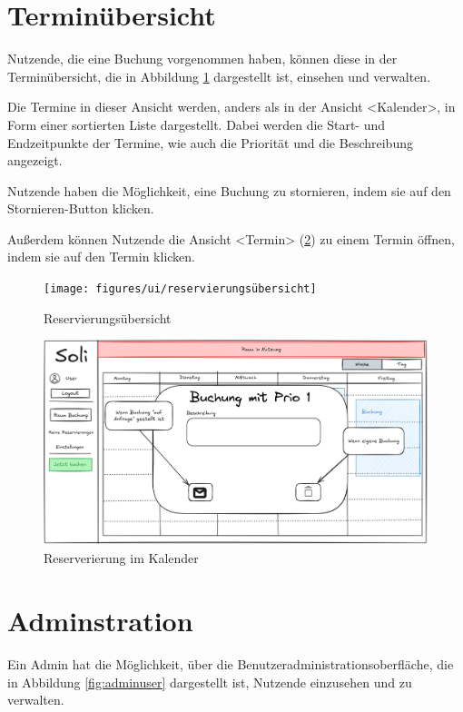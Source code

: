 \section{Terminübersicht}
Nutzende, die eine Buchung vorgenommen haben, können diese in der Terminübersicht,
die in Abbildung \ref{fig:overview} dargestellt ist, einsehen und verwalten.

Die Termine in dieser Ansicht werden, anders als in der Ansicht <Kalender>, in Form einer sortierten Liste dargestellt.
Dabei werden die Start- und Endzeitpunkte der Termine, wie auch die Priorität und die Beschreibung angezeigt.

Nutzende haben die Möglichkeit, eine Buchung zu stornieren, indem sie auf den Stornieren-Button klicken.

Außerdem können Nutzende die Ansicht <Termin> (\ref{fig:calendarviewbooking}) zu einem Termin öffnen, indem sie auf den Termin klicken.

\begin{figure}[ht]
    \texttt{[image: figures/ui/reservierungsübersicht]}
    \caption{Reservierungsübersicht}
    \label{fig:overview}
\end{figure}
\clearpage
\begin{figure}
    \centering
    \includegraphics[scale=0.15]{figures/ui/reservierunginkalendar}
    \caption{Reserverierung im Kalender}
    \label{fig:calendarviewbooking}
\end{figure}

\section{Adminstration}
Ein Admin hat die Möglichkeit, über die Benutzeradministrationsoberfläche, die in Abbildung \ref{fig:adminuser} dargestellt ist, Nutzende einzusehen und zu verwalten.

